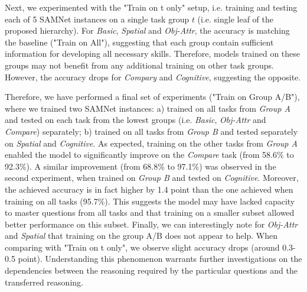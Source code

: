 Next, we experimented with the "Train on t only" setup, i.e. training and testing each of 5 SAMNet instances on a single task group $t$ (i.e. single leaf of the proposed hierarchy).
For \textit{Basic}, \textit{Spatial} and \textit{Obj-Attr}, the accuracy is matching the baseline ("Train on All"), suggesting that each group contain sufficient information for developing all necessary skills.
Therefore, models trained on these groups may not benefit from any additional training on other task groups.
However, the accuracy drops for \textit{Compary} and \textit{Cognitive}, suggesting the opposite.

Therefore, we have performed a final set of experiments ("Train on Group A/B"), where we trained two SAMNet instances: a) trained on all tasks from \textit{Group A} and tested on each task from the lowest groups (i.e. \textit{Basic}, \textit{Obj-Attr} and \textit{Compare}) separately; b) trained on all tasks from \textit{Group B} and tested separately on \textit{Spatial} and \textit{Cognitive}.
As expected, training on the other tasks from \textit{Group A} enabled the model to significantly improve on the \textit{Compare} task (from 58.6\% to 92.3\%).
A similar improvement (from 68.8\% to 97.1\%) was observed in the second experiment, when trained on \textit{Group B} and tested on \textit{Cognitive}.
Moreover, the achieved accuracy is in fact higher by 1.4 point than the one achieved when training on all tasks (95.7\%).
This suggests the model may have lacked capacity to master questions from all tasks and that training on a smaller subset allowed better performance on this subset.
Finally, we can interestingly note for \textit{Obj-Attr} and \textit{Spatial} that training on the group A/B does not appear to help. When comparing with "Train on t only", we observe slight accuracy drops (around 0.3-0.5 point).
Understanding this phenomenon warrants further investigations on the dependencies between the reasoning required by the particular questions and the transferred reasoning.


